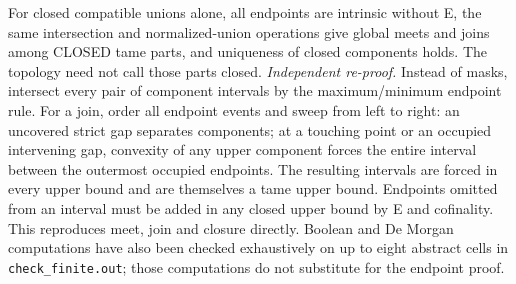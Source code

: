 For closed compatible unions alone, all endpoints are intrinsic without E, the same intersection and normalized-union operations give global meets and joins among CLOSED tame parts, and uniqueness of closed components holds. The topology need not call those parts closed.
\emph{Independent re-proof.} Instead of masks, intersect every pair of component intervals by the maximum/minimum endpoint rule. For a join, order all endpoint events and sweep from left to right: an uncovered strict gap separates components; at a touching point or an occupied intervening gap, convexity of any upper component forces the entire interval between the outermost occupied endpoints. The resulting intervals are forced in every upper bound and are themselves a tame upper bound. Endpoints omitted from an interval must be added in any closed upper bound by E and cofinality. This reproduces meet, join and closure directly. Boolean and De Morgan computations have also been checked exhaustively on up to eight abstract cells in \texttt{check\_finite.out}; those computations do not substitute for the endpoint proof.


